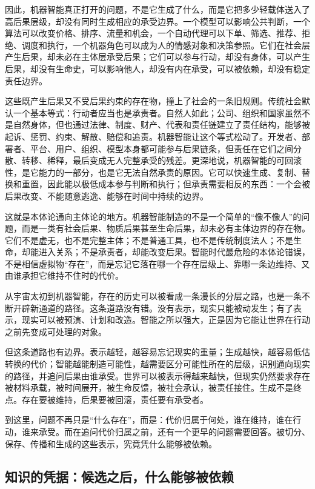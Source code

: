 因此，机器智能真正打开的问题，不是它生成了什么，而是它把多少轻载体送入了高后果层级，却没有同时生成相应的承受边界。一个模型可以影响公共判断，一个算法可以改变价格、排序、流量和机会，一个自动代理可以下单、筛选、推荐、拒绝、调度和执行，一个机器角色可以成为人的情感对象和决策参照。它们在社会层产生后果，却未必在主体层承受后果；它们可以参与行动，却没有身体，可以产生后果，却没有生命史，可以影响他人，却没有内在承受，可以被依赖，却没有稳定责任边界。

这些既产生后果又不受后果约束的存在物，撞上了社会的一条旧规则。传统社会默认一个基本等式：行动者应当也是承责者。自然人如此；公司、组织和国家虽然不是自然身体，但也通过法律、制度、财产、代表和责任链建立了责任结构，能够被起诉、惩罚、约束、解散、赔偿和追责\cite{dewey1926historic}。机器智能让这个等式松动了。开发者、部署者、平台、用户、组织、模型本身都可能参与后果链条，但责任在它们之间分散、转移、稀释，最后变成无人完整承受的残差。更深地说，机器智能的可回滚性，是它能力的一部分，也是它无法自然承责的原因。它可以快速生成、复制、替换和重置，因此能以极低成本参与判断和执行；但承责需要相反的东西：一个会被后果改变、不能随意逃逸、能够在时间中持续的边界。

这就是本体论通向主体论的地方。机器智能制造的不是一个简单的“像不像人”的问题，而是一类有社会后果、物质后果甚至生命后果，却未必有主体边界的存在物。它们不是虚无，也不是完整主体；不是普通工具，也不是传统制度法人；不是生命，却能进入关系；不是承责者，却能改变后果。智能时代最危险的本体论错误，不是相信虚拟物“存在”，而是忘记它落在哪一个存在层级上、靠哪一条边维持、又由谁承担它维持不住时的代价。

从宇宙太初到机器智能，存在的历史可以被看成一条漫长的分层之路，也是一条不断开辟新通道的路径。这条道路没有错。没有表示，现实只能被动发生；有了表示，现实可以被预演、计划和改造。智能之所以强大，正是因为它能让世界在行动之前先变成可处理的对象。

但这条道路也有边界。表示越轻，越容易忘记现实的重量；生成越快，越容易低估转换的代价；智能越能制造可能性，越需要区分可能性所在的层级，识别通向现实的路径，并追问后果由谁承受。世界可以被表示得越来越快，但现实仍然要求存在被材料承载，被时间展开，被生命反馈，被社会承认，被责任接住。生成不是终点。存在要被维持，后果要被回滚，责任要有承受者。

到这里，问题不再只是“什么存在”，而是：代价归属于何处，谁在维持，谁在行动，谁来承受。而在追问代价归属之前，还有一个更早的问题需要回答。被切分、保存、传播和生成的这些表示，究竟凭什么能够被依赖。

\subsection{知识的凭据：候选之后，什么能够被依赖}

